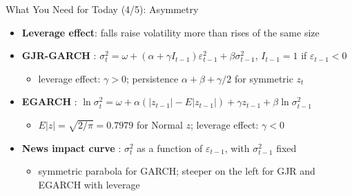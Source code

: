 \begin{frame}{What You Need for Today (4/5): Asymmetry}
\itemsize{\small}
\begin{itemize}
    \item \textbf{Leverage effect}: falls raise volatility more than rises of the same size 
    \item \textbf{GJR-GARCH} : $\sigma_t^2 = \omega + (\alpha + \gamma I_{t-1})\varepsilon_{t-1}^2 + \beta\sigma_{t-1}^2$, $I_{t-1} = 1$ if $\varepsilon_{t-1} < 0$
    \begin{itemize}
        \item leverage effect: $\gamma > 0$; persistence $\alpha + \beta + \gamma/2$ for symmetric $z_t$
    \end{itemize}
    \item \textbf{EGARCH} : $\ln\sigma_t^2 = \omega + \alpha(|z_{t-1}| - E|z_{t-1}|) + \gamma z_{t-1} + \beta\ln\sigma_{t-1}^2$
    \begin{itemize}
        \item $E|z| = \sqrt{2/\pi} = 0.7979$ for Normal $z$; leverage effect: $\gamma < 0$
    \end{itemize}
    \item \textbf{News impact curve} : $\sigma_t^2$ as a function of $\varepsilon_{t-1}$, with $\sigma_{t-1}^2$ fixed
    \begin{itemize}
        \item symmetric parabola for GARCH; steeper on the left for GJR and EGARCH with leverage
    \end{itemize}
\end{itemize}
\end{frame}

